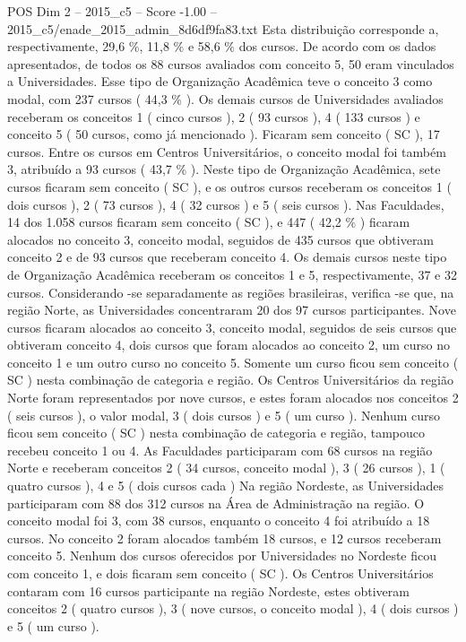 \begin{textsample}{POS Dim 2 – 2015\_c5 – Score -1.00 – 2015\_c5/enade\_2015\_admin\_8d6df9fa83.txt}
Esta distribuição corresponde a, respectivamente, 29,6 \%, 11,8 \% e 58,6 \% dos cursos.
De acordo com os dados apresentados, de todos os 88 cursos avaliados com conceito 5, 50 eram vinculados a Universidades.
Esse tipo de Organização Acadêmica teve o conceito 3 como modal, com 237 cursos ( 44,3 \% ).
Os demais cursos de Universidades avaliados receberam os conceitos 1 ( cinco cursos ), 2 ( 93 cursos ), 4 ( 133 cursos ) e conceito 5 ( 50 cursos, como já mencionado ).
Ficaram sem conceito ( SC ), 17 cursos.
Entre os cursos em Centros Universitários, o conceito modal foi também 3, atribuído a 93 cursos ( 43,7 \% ).
Neste tipo de Organização Acadêmica, sete cursos ficaram sem conceito ( SC ), e os outros cursos receberam os conceitos 1 ( dois cursos ), 2 ( 73 cursos ), 4 ( 32 cursos ) e 5 ( seis cursos ).
Nas Faculdades, 14 dos 1.058 cursos ficaram sem conceito ( SC ), e 447 ( 42,2 \% ) ficaram alocados no conceito 3, conceito modal, seguidos de 435 cursos que obtiveram conceito 2 e de 93 cursos que receberam conceito 4.
Os demais cursos neste tipo de Organização Acadêmica receberam os conceitos 1 e 5, respectivamente, 37 e 32 cursos.
Considerando -se separadamente as regiões brasileiras, verifica -se que, na região Norte, as Universidades concentraram 20 dos 97 cursos participantes.
Nove cursos ficaram alocados ao conceito 3, conceito modal, seguidos de seis cursos que obtiveram conceito 4, dois cursos que foram alocados ao conceito 2, um curso no conceito 1 e um outro curso no conceito 5.
Somente um curso ficou sem conceito ( SC ) nesta combinação de categoria e região.
Os Centros Universitários da região Norte foram representados por nove cursos, e estes foram alocados nos conceitos 2 ( seis cursos ), o valor modal, 3 ( dois cursos ) e 5 ( um curso ).
Nenhum curso ficou sem conceito ( SC ) nesta combinação de categoria e região, tampouco recebeu conceito 1 ou 4.
As Faculdades participaram com 68 cursos na região Norte e receberam conceitos 2 ( 34 cursos, conceito modal ), 3 ( 26 cursos ), 1 ( quatro cursos ), 4 e 5 ( dois cursos cada ) Na região Nordeste, as Universidades participaram com 88 dos 312 cursos na Área de Administração na região.
O conceito modal foi 3, com 38 cursos, enquanto o conceito 4 foi atribuído a 18 cursos.
No conceito 2 foram alocados também 18 cursos, e 12 cursos receberam conceito 5.
Nenhum dos cursos oferecidos por Universidades no Nordeste ficou com conceito 1, e dois ficaram sem conceito ( SC ).
Os Centros Universitários contaram com 16 cursos participante na região Nordeste, estes obtiveram conceitos 2 ( quatro cursos ), 3 ( nove cursos, o conceito modal ), 4 ( dois cursos ) e 5 ( um curso ).

\end{textsample}
